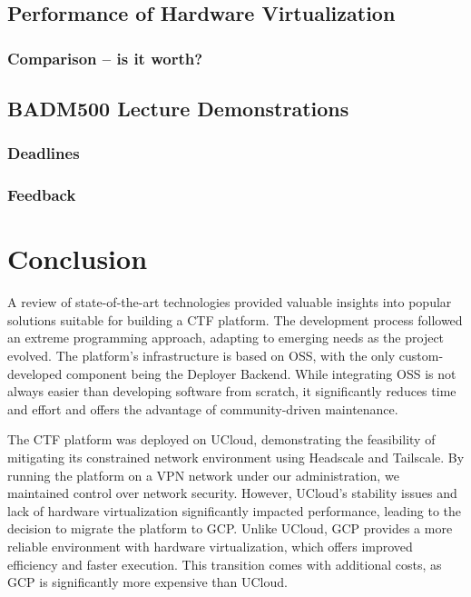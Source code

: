 \section{Performance of Hardware Virtualization}

\subsection{Comparison -- is it worth?}

\section{BADM500 Lecture Demonstrations}

\subsection{Deadlines}

\subsection{Feedback}

\chapter{Conclusion}
A review of state-of-the-art technologies provided valuable insights into popular solutions suitable for building a CTF platform. The development process followed an extreme programming approach, adapting to emerging needs as the project evolved. The platform's infrastructure is based on OSS, with the only custom-developed component being the Deployer Backend. While integrating OSS is not always easier than developing software from scratch, it significantly reduces time and effort and offers the advantage of community-driven maintenance.

The CTF platform was deployed on UCloud, demonstrating the feasibility of mitigating its constrained network environment using Headscale and Tailscale. By running the platform on a VPN network under our administration, we maintained control over network security. However, UCloud's stability issues and lack of hardware virtualization significantly impacted performance, leading to the decision to migrate the platform to GCP. Unlike UCloud, GCP provides a more reliable environment with hardware virtualization, which offers improved efficiency and faster execution. This transition comes with additional costs, as GCP is significantly more expensive than UCloud.

